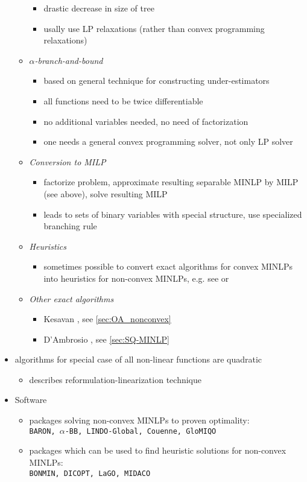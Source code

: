 \documentclass{article}
\begin{document}
\begin{itemize}
\begin{itemize}
\begin{itemize}
		\item drastic decrease in size of tree
		\item usally use LP relaxations (rather than convex programming relaxations)
		\end{itemize}
	\item \emph{$\alpha$-branch-and-bound}
		\begin{itemize}
		\item based on general technique for constructing under-estimators
		\item all functions need to be twice differentiable
		\item no additional variables needed, no need of factorization
		\item one needs a general convex programming solver, not only LP solver
		\end{itemize}
	\item \emph{Conversion to MILP}
		\begin{itemize}
		\item factorize problem, approximate resulting separable MINLP by MILP (see above), solve resulting MILP
		\item leads to sets of binary variables with special structure, use specialized branching rule
		\end{itemize}
	\item \emph{Heuristics}
		\begin{itemize}
		\item sometimes possible to convert exact algorithms for convex MINLPs into heuristics for non-convex MINLPs, e.g. see \cite{leyffer2001integrating} or \cite{nannicini2012rounding}
		\end{itemize}
	\item \emph{Other exact algorithms}
		\begin{itemize}
		\item Kesavan \cite{kesavan2004outer}, see \ref{sec:OA_nonconvex}
		\item D'Ambrosio \cite{d2012algorithmic}, see \ref{sec:SQ-MINLP}
		\end{itemize}
	\end{itemize}
\item algorithms for special case of all non-linear functions are quadratic
	\begin{itemize}
	\item describes reformulation-linearization technique
	\end{itemize}
\item Software 
	\begin{itemize}
	\item packages solving non-convex MINLPs to proven optimality:\\
	 \texttt{BARON, $\alpha$-BB, LINDO-Global, Couenne, GloMIQO} 
	\item packages which can be used to find heuristic solutions for non-convex MINLPs: \\
	\texttt{BONMIN, DICOPT, LaGO, MIDACO}
	\end{itemize}	 
\end{itemize}
\end{document}
